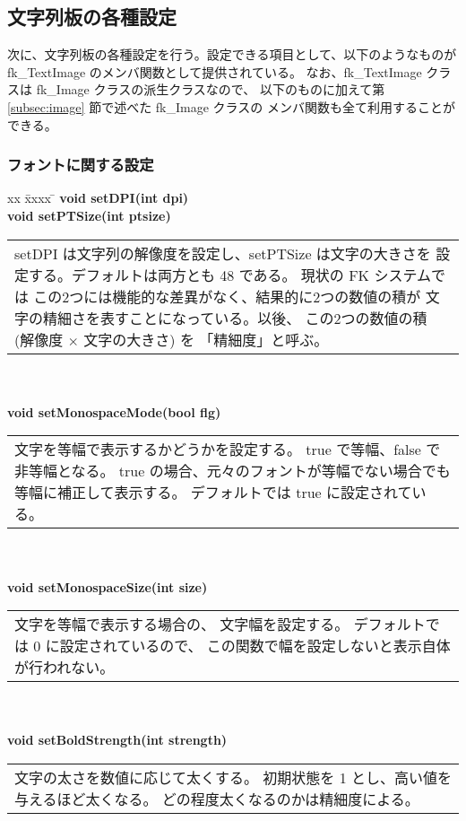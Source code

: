 \subsection{文字列板の各種設定}
次に、文字列板の各種設定を行う。設定できる項目として、以下のようなものが
fk\_TextImage のメンバ関数として提供されている。
なお、fk\_TextImage クラスは fk\_Image クラスの派生クラスなので、
以下のものに加えて第 \ref{subsec:image} 節で述べた fk\_Image クラスの
メンバ関数も全て利用することができる。

\subsubsection{フォントに関する設定}
\begin{tabbing}
xx \= xxxx \= \kill
\> \textbf{void setDPI(int dpi)} \\
\> \textbf{void setPTSize(int ptsize)} \\
	\> \> \begin{tabular}{p{15cm}}
		setDPI は文字列の解像度を設定し、setPTSize は文字の大きさを
		設定する。デフォルトは両方とも 48 である。
		現状の FK システムでは
		この2つには機能的な差異がなく、結果的に2つの数値の積が
		文字の精細さを表すことになっている。以後、
		この2つの数値の積 (解像度 \(\times\) 文字の大きさ) を
		「精細度」と呼ぶ。
	\end{tabular} \\ \\

\> \textbf{void setMonospaceMode(bool flg)} \\
	\> \> \begin{tabular}{p{15cm}}
		文字を等幅で表示するかどうかを設定する。
		true で等幅、false で非等幅となる。
		true の場合、元々のフォントが等幅でない場合でも
		等幅に補正して表示する。
		デフォルトでは true に設定されている。
	\end{tabular} \\ \\

\> \textbf{void setMonospaceSize(int size)} \\
	\> \> \begin{tabular}{p{15cm}}
		文字を等幅で表示する場合の、
		文字幅を設定する。
		デフォルトでは 0 に設定されているので、
		この関数で幅を設定しないと表示自体が行われない。
	\end{tabular} \\ \\

\> \textbf{void setBoldStrength(int strength)} \\
	\> \> \begin{tabular}{p{15cm}}
		文字の太さを数値に応じて太くする。
		初期状態を 1 とし、高い値を与えるほど太くなる。
		どの程度太くなるのかは精細度による。
	\end{tabular} \\ \\


\end{tabbing}
